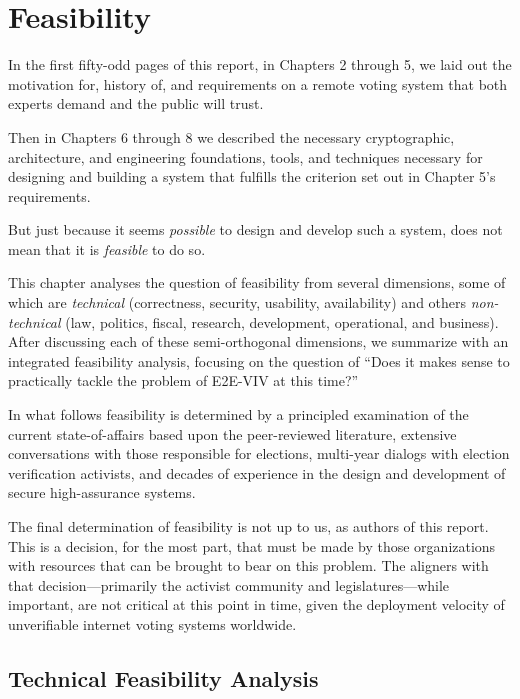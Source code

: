 \chapter{Feasibility}
\label{chapter:feasibility}

In the first fifty-odd pages of this report, in Chapters 2 through 5,
we laid out the motivation for, history of, and requirements on a
remote voting system that both experts demand and the public will
trust.  

Then in Chapters 6 through 8 we described the necessary cryptographic,
architecture, and engineering foundations, tools, and techniques
necessary for designing and building a system that fulfills the
criterion set out in Chapter 5's requirements.

But just because it seems \emph{possible} to design and develop such a
system, does not mean that it is \emph{feasible} to do so.

This chapter analyses the question of feasibility from several
dimensions, some of which are \emph{technical} (correctness, security,
usability, availability) and others \emph{non-technical} (law,
politics, fiscal, research, development, operational, and
business). After discussing each of these semi-orthogonal dimensions,
we summarize with an integrated feasibility analysis, focusing on the
question of ``Does it makes sense to practically tackle the problem of
E2E-VIV at this time?''

In what follows feasibility is determined by a principled examination
of the current state-of-affairs based upon the peer-reviewed
literature, extensive conversations with those responsible for
elections, multi-year dialogs with election verification activists,
and decades of experience in the design and development of secure
high-assurance systems.

The final determination of feasibility is not up to us, as authors of
this report. This is a decision, for the most part, that must be made
by those organizations with resources that can be brought to bear on
this problem. The aligners with that decision---primarily the activist
community and legislatures---while important, are not critical at this
point in time, given the deployment velocity of unverifiable internet
voting systems worldwide.

\section{Technical Feasibility Analysis}

